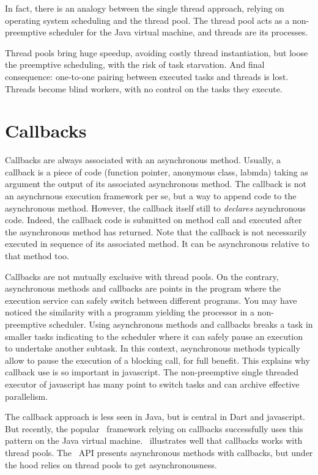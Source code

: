 In fact, there is an analogy between the single thread approach, relying on operating system scheduling and the thread pool. The thread pool acts as a non-preemptive scheduler for the Java virtual machine, and threads are its processes.

Thread pools bring huge speedup, avoiding costly thread instantiation, but loose the preemptive scheduling, with the risk of task starvation.
And final consequence: one-to-one pairing between executed tasks and threads is lost. Threads become blind workers, with no control on the tasks they execute.

\section{Callbacks}

Callbacks are always associated with an asynchronous method. Usually, a callback is a piece of code (function pointer, anonymous class, labmda) taking as argument the output of its associated asynchronous method. The callback is not an asynchrnous execution framework per se, but a way to append code to the asynchronous method. However, the callback itself still to \emph{declares} asynchronous code. Indeed, the callback code is submitted on method call and executed after the asynchronous method has returned. Note that the callback is not necessarily executed in sequence of its associated method. It can be asynchronous relative to that method too.

Callbacks are not mutually exclusive with thread pools. On the contrary, asynchronous methods and callbacks are points in the program where the execution service can safely switch between different programs. You may have noticed the similarity with a programm yielding the processor in a non-preemptive scheduler. Using asynchronous methods and callbacks breaks a task in smaller tasks indicating to the scheduler where it can safely pause an execution to undertake another subtask. In this context, asynchronous methods typically allow to pause the execution of a blocking call, for full benefit. This explains why callback use is so important in javascript. The non-preemptive single threaded executor of javascript has many point to switch tasks and can archive effective parallelism.

The callback approach is less seen in Java, but is central in Dart and javascript. But recently, the popular \vertx\ framework relying on callbacks successfully uses this pattern on the Java virtual machine. \vertx\ illustrates well that callbacks works with thread pools. The \vertx\ API presents asynchronous methods with callbacks, but under the hood relies on thread pools to get asynchronousness.


